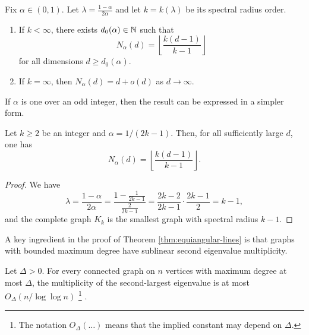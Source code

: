 \begin{theorem} \label{thm:equiangular-lines}
    Fix $\alpha \in (0, 1)$. 
    Let $\lambda = \frac{1 - \alpha}{2 \alpha}$ and let $k = k(\lambda)$ be its spectral radius order. 
    \begin{enumerate}
        \item If $k < \infty$, there exists $d_0 (\alpha) \in \mathbb{N}$ such that
            \begin{equation*}
                N_\alpha (d) = \left \lfloor \frac{k (d - 1)}{k - 1}  \right \rfloor
            \end{equation*}
            for all dimensions $d \ge d_0 (\alpha)$.
        \item If $k = \infty$, then $N_\alpha (d) = d + o(d)$ as $d \rightarrow \infty$.
    \end{enumerate}
\end{theorem}

If $\alpha$ is one over an odd integer, then the result can be expressed in a simpler form. 
\begin{corollary}
    Let $k \ge 2$ be an integer and $\alpha = 1 / (2k - 1)$. Then, for all sufficiently large $d$, one has
    \begin{equation*}
        N_\alpha(d) = \left \lfloor \frac{k (d - 1)}{k - 1}  \right \rfloor.
    \end{equation*}
\end{corollary}

\begin{proof}
    We have 
    \begin{equation*}
        \lambda = \frac{1 - \alpha}{2 \alpha} = \frac{1 - \frac{1}{2k - 1}}{\frac{2}{2k - 1}} = \frac{2k - 2}{2k - 1} \cdot \frac{2k - 1}{2} = k - 1,
    \end{equation*}
    and the complete graph $K_{k}$ is the smallest graph with spectral radius $k - 1$. 
\end{proof}

A key ingredient in the proof of Theorem \ref{thm:equiangular-lines} is that graphs with bounded maximum degree have sublinear second eigenvalue multiplicity.

\begin{theorem} \label{thm:snd-eigval-multiplicity}
    Let $\Delta > 0$. 
    For every connected graph on $n$ vertices with maximum degree at most $\Delta$, the multiplicity of the second-largest eigenvalue is at most $O_\Delta (n / \log \log n)$
    \footnote{The notation $O_\Delta (\dots)$ means that the implied constant may depend on $\Delta$.}
    \mbox{.}
\end{theorem}

